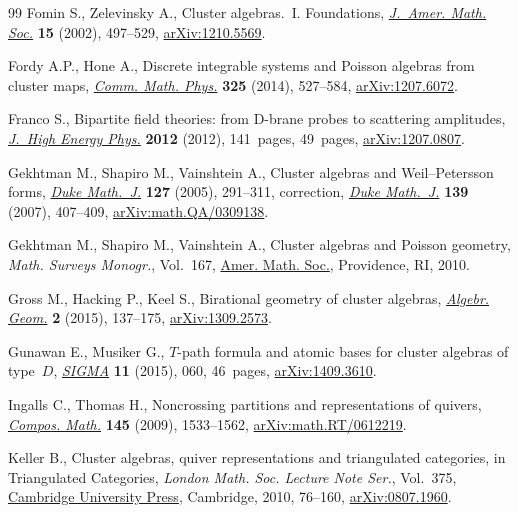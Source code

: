 \begin{thebibliography}{99}
Fomin S., Zelevinsky A., Cluster algebras.~{I}. {F}oundations, \href{https://doi.org/10.1090/S0894-0347-01-00385-X}{\textit{J.~Amer.
 Math. Soc.}} \textbf{15} (2002), 497--529, \href{https://arxiv.org/abs/1210.5569}{arXiv:1210.5569}.

Fordy A.P., Hone A., Discrete integrable systems and {P}oisson algebras from
 cluster maps, \href{https://doi.org/10.1007/s00220-013-1867-y}{\textit{Comm. Math. Phys.}} \textbf{325} (2014), 527--584,
 \href{https://arxiv.org/abs/1207.6072}{arXiv:1207.6072}.

Franco S., Bipartite field theories: from {D}-brane probes to scattering
 amplitudes, \href{https://doi.org/10.1007/JHEP11(2012)141}{\textit{J.~High Energy Phys.}} \textbf{2012} (2012), 141~pages,
 49~pages, \href{https://arxiv.org/abs/1207.0807}{arXiv:1207.0807}.

Gekhtman M., Shapiro M., Vainshtein A., Cluster algebras and
 {W}eil--{P}etersson forms, \href{https://doi.org/10.1215/S0012-7094-04-12723-X}{\textit{Duke Math.~J.}} \textbf{127} (2005),
 291--311, correction,
 \href{https://doi.org/10.1215/S0012-7094-07-13925-5}{\textit{Duke Math.~J.}}
 \textbf{139} (2007), 407--409, \href{https://arxiv.org/abs/math.QA/0309138}{arXiv:math.QA/0309138}.

Gekhtman M., Shapiro M., Vainshtein A., Cluster algebras and {P}oisson
 geometry, \textit{Math. Surveys Monogr.}, Vol.~167, \href{https://doi.org/10.1090/surv/167}{Amer. Math. Soc.},
 Providence, RI, 2010.

Gross M., Hacking P., Keel S., Birational geometry of cluster algebras,
 \href{https://doi.org/10.14231/AG-2015-007}{\textit{Algebr. Geom.}} \textbf{2} (2015), 137--175, \href{https://arxiv.org/abs/1309.2573}{arXiv:1309.2573}.

Gunawan E., Musiker G., {$T$}-path formula and atomic bases for cluster
 algebras of type~{$D$}, \href{https://doi.org/10.3842/SIGMA.2015.060}{\textit{SIGMA}} \textbf{11} (2015), 060, 46~pages,
 \href{https://arxiv.org/abs/1409.3610}{arXiv:1409.3610}.

Ingalls C., Thomas H., Noncrossing partitions and representations of quivers,
 \href{https://doi.org/10.1112/S0010437X09004023}{\textit{Compos. Math.}} \textbf{145} (2009), 1533--1562,
 \href{https://arxiv.org/abs/math.RT/0612219}{arXiv:math.RT/0612219}.

Keller B., Cluster algebras, quiver representations and triangulated
 categories, in Triangulated Categories, \textit{London Math. Soc. Lecture
 Note Ser.}, Vol.~375, \href{https://doi.org/10.1017/CBO9781139107075.004}{Cambridge University Press}, Cambridge, 2010, 76--160,
 \href{https://arxiv.org/abs/0807.1960}{arXiv:0807.1960}.


\end{thebibliography}
